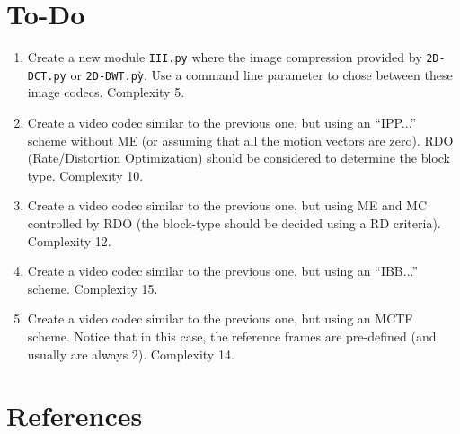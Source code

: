 \section{To-Do}

\begin{enumerate}
\item Create a new module \texttt{III.py} where the image
  compression provided by \texttt{2D-DCT.py} or
  \texttt{2D-DWT.pỳ}. Use a command line parameter to chose between
  these image codecs. Complexity 5.
\item Create a video codec similar to the previous one, but using an
  ``IPP...''  scheme without ME (or assuming that all the motion
  vectors are zero). RDO (Rate/Distortion Optimization) should be
  considered to determine the block type. Complexity 10.
\item Create a video codec similar to the previous one, but using ME
  and MC controlled by RDO (the block-type should be decided using a
  RD criteria). Complexity 12.
\item Create a video codec similar to the previous one, but using an
  ``IBB...'' scheme. Complexity 15.
\item Create a video codec similar to the previous one, but using an
  MCTF scheme. Notice that in this case, the reference frames are
  pre-defined (and usually are always 2). Complexity 14.
\end{enumerate}

  
\section{References}

\renewcommand{\addcontentsline}[3]{}%


